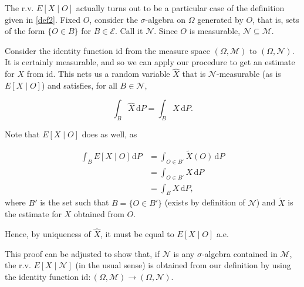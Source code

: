 \documentclass{article}
\newcommand{\M}{\mathcal{M}}
\newcommand{\N}{\mathcal{N}}
\newcommand{\E}{\mathcal{E}}
\newcommand{\dd}{\,\mathrm{d}}
\newcommand{\id}{\mathrm{id}}
\begin{document}
	The r.v. $E[X \mid O]$ actually turns out to be a particular case of the definition given in \eqref{def2}. Fixed $O$, consider the $\sigma$-algebra on $\Omega$ generated by $O$, that is, sets of the form $\{O \in B\}$ for $B \in \E$. Call it $\N$. Since $O$ is measurable, $\N \subseteq \M$.
	
	Consider the identity function $\id$ from the measure space $(\Omega, \M)$ to $(\Omega, \N)$. It is certainly measurable, and so we can apply our procedure to get an estimate for $X$ from $\id$. This nets us a random variable $\hat X$ that is $\N$-measurable (as is $E[X \mid O]$) and satisfies, for all $B \in \N$,
	
	\[\int_B \hat X \dd P = \int_B X \dd P.\]
	
	Note that $E[X \mid O]$ does as well, as
	
	\begin{align*}
	\int_B E[X \mid O] \dd P &= \int_{O \in B'} \tilde X(O) \dd P\\
	&= \int_{O \in B'} X \dd P\\
	&= \int_B X \dd P,
	\end{align*}
	where $B'$ is the set such that $B = \{O \in B'\}$ (exists by definition of $\N$) and $\tilde X$ is the estimate for $X$ obtained from $O$.
	
	Hence, by uniqueness of $\hat X$, it must be equal to $E[X \mid O]$ a.e.
	
	\smallskip
	
	This proof can be adjusted to show that, if $\N$ is any $\sigma$-algebra contained in $\M$, the r.v. $E[X \mid \N]$ (in the usual sense) is obtained from our definition by using the identity function $\id : (\Omega, \M) \to (\Omega, \N)$.
\end{document}

